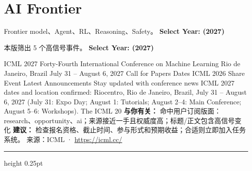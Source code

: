 \documentclass[10.5pt]{ctexart}
\begin{document}
\section*{AI Frontier}
{\color{ormuted} Frontier model、Agent、RL、Reasoning、Safety。}
\vspace{2mm}
{\LARGE\bfseries Select Year: (2027)}\par
\vspace{1mm}
{\color{ormuted} 本版筛出 5 个高信号事件。}
\vspace{3mm}
{\Large\bfseries Select Year: (2027)}\par
ICML 2027 Forty-Fourth International Conference on Machine Learning Rio de Janeiro, Brazil July 31 – August 6, 2027 Call for Papers Dates ICML 2026 Share Event Latest Announcements Stay updated with conference news ICML 2027 dates and location confirmed: Riocentro, Rio de Janeiro, Brazil, July 31 – August 6, 2027 (July 31: Expo Day; August 1: Tutorials; August 2–4: Main Conference; August 5–6: Workshops). The ICML 20
\textbf{与你有关：} 命中用户订阅版面：research、opportunity、ai；来源接近一手且权威度高；标题/正文包含高信号变化
\textbf{建议：} 检查报名资格、截止时间、参与形式和预期收益；合适则立即加入任务系统。
{\footnotesize\color{ormuted} 来源：ICML · \url{https://icml.cc/}}
\vspace{4mm}
\hrule height 0.25pt
\vspace{3mm}
\end{document}
